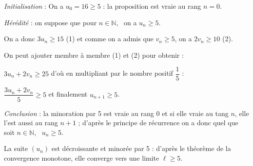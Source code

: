 \documentclass[10pt]{article}
\providecommand{\N}{\mathbb{N}}
\begin{document}
\begin{enumerate}
\begin{enumerate}[resume]
\emph{Initialisation } : On a $u_0 = 16 \geqslant 5$ : la proposition est vraie au rang $n = 0$.

\emph{Hérédité} : on suppose que pour $n \in \N$, \, on a $u_n \geqslant 5$.

On a donc $3u_n \geqslant 15$ (1) et comme on a admis que $v_n \geqslant 5$, on a $2v_n \geqslant 10$ (2).

On peut ajouter membre à membre (1) et (2) pour obtenir :

$3u_n + 2v_n \geqslant 25$ d'où en multipliant par le nombre positif $\dfrac{1}{5}$ :

$\dfrac{3u_n + 2v_n}{5} \geqslant 5$ et finalement $u_{n+1} \geqslant 5$.

\emph{Conclusion } : la minoration par 5 est vraie au rang 0 et si elle vraie au tang $n$, elle l'est aussi au rang $n + 1$ ; d'après le principe de récurrence on a donc quel que soit $n \in \N$, \, $u_n \geqslant 5$.


La suite $\left(u_n\right)$ est décroissante et minorée par 5 : d'après le théorème de la convergence monotone,  elle converge  vers une limite $\ell \geqslant 5$.
	\end{enumerate}
\end{enumerate}
	
\end{document}
